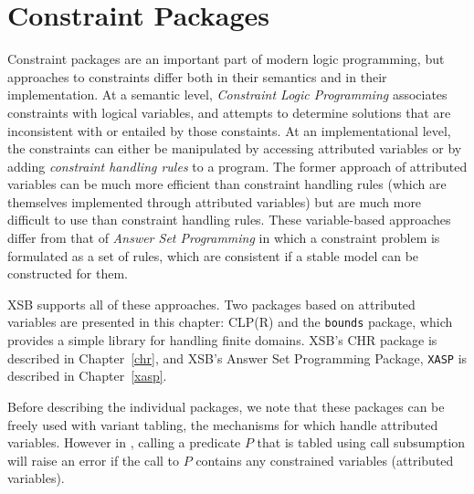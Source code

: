 \chapter{Constraint Packages} \label{chap:constraints}

Constraint packages are an important part of modern logic programming,
but approaches to constraints differ both in their semantics and in
their implementation.  At a semantic level, {\em Constraint Logic
  Programming} associates constraints with logical variables, and
attempts to determine solutions that are inconsistent with or entailed
by those constaints.  At an implementational level, the constraints
can either be manipulated by accessing attributed variables or by
adding {\em constraint handling rules} to a program.  The former
approach of attributed variables can be much more efficient than
constraint handling rules (which are themselves implemented through
attributed variables) but are much more difficult to use than
constraint handling rules.  These variable-based approaches differ
from that of {\em Answer Set Programming} in which a constraint
problem is formulated as a set of rules, which are consistent if a
stable model can be constructed for them.

XSB supports all of these approaches.  Two packages based on
attributed variables are presented in this chapter: CLP(R) and the
{\tt bounds} package, which provides a simple library for handling
finite domains.  XSB's CHR package is described in Chapter~\ref{chr},
and XSB's Answer Set Programming Package, {\tt XASP} is described in
Chapter~\ref{xasp}.

Before describing the individual packages, we note that these packages
can be freely used with variant tabling, the mechanisms for which
handle attributed variables.  However in \version{}, calling a
predicate $P$ that is tabled using call subsumption will raise an
error if the call to $P$ contains any constrained variables
(attributed variables).

